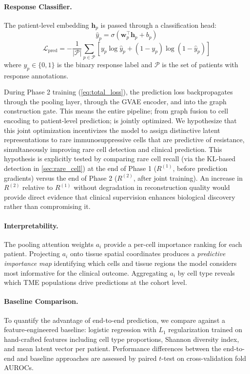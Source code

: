 \documentclass{article}
\newcommand{\sigmoid}{\sigma}
\begin{document}
\paragraph{Response Classifier.} The patient-level embedding $\mathbf{h}_p$ is passed through a classification head:
\begin{equation}
    \hat{y}_p = \sigmoid(\mathbf{w}_p^\top \mathbf{h}_p + b_p)
    \label{eq:classifier}
\end{equation}
\begin{equation}
    \mathcal{L}_{\text{pred}} = -\frac{1}{|\mathcal{P}|} \sum_{p \in \mathcal{P}} \left[ y_p \log \hat{y}_p + (1 - y_p) \log(1 - \hat{y}_p) \right]
    \label{eq:pred_loss}
\end{equation}
where $y_p \in \{0, 1\}$ is the binary response label and $\mathcal{P}$ is the set of patients with response annotations.

During Phase 2 training (\cref{eq:total_loss}), the prediction loss backpropagates through the pooling layer, through the GVAE encoder, and into the graph construction gate. This means the entire pipeline; from graph fusion to cell encoding to patient-level prediction; is jointly optimized. We hypothesize that this joint optimization incentivizes the model to assign distinctive latent representations to rare immunosuppressive cells that are predictive of resistance, simultaneously improving rare cell detection and clinical prediction. This hypothesis is explicitly tested by comparing rare cell recall (via the KL-based detection in \cref{sec:rare_cell}) at the end of Phase 1 ($R^{(1)}$, before prediction gradients) versus the end of Phase 2 ($R^{(2)}$, after joint training). An increase in $R^{(2)}$ relative to $R^{(1)}$ without degradation in reconstruction quality would provide direct evidence that clinical supervision enhances biological discovery rather than compromising it.

\paragraph{Interpretability.} The pooling attention weights $a_i$ provide a per-cell importance ranking for each patient. Projecting $a_i$ onto tissue spatial coordinates produces a \textit{predictive importance map} identifying which cells and tissue regions the model considers most informative for the clinical outcome. Aggregating $a_i$ by cell type reveals which TME populations drive predictions at the cohort level.

\paragraph{Baseline Comparison.} To quantify the advantage of end-to-end prediction, we compare against a feature-engineered baseline: logistic regression with $L_1$ regularization trained on hand-crafted features including cell type proportions, Shannon diversity index, and mean latent vector per patient. Performance differences between the end-to-end and baseline approaches are assessed by paired $t$-test on cross-validation fold AUROCs.
\end{document}
